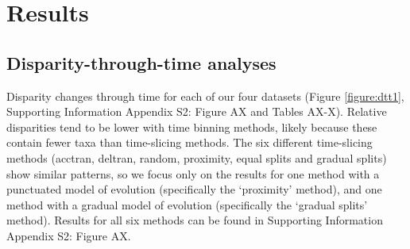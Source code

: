 \documentclass[12pt,a4paper]{article}
\begin{document}
\section{Results} 

\subsection{Disparity-through-time analyses}

Disparity changes through time for each of our four datasets (Figure \ref{figure:dtt1}, Supporting Information Appendix S2: Figure AX and Tables AX-X). %
Relative disparities tend to be lower with time binning methods, likely because these contain fewer taxa than time-slicing methods.
The six different time-slicing methods (acctran, deltran, random, proximity, equal splits and gradual splits) show similar patterns, so we focus only on the results for one method with a punctuated model of evolution (specifically the `proximity' method), and one method with a gradual model of evolution (specifically the `gradual splits' method).
Results for all six methods can be found in Supporting Information Appendix S2: Figure AX. %
\end{document}
